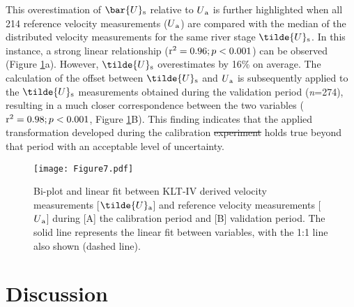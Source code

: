 \documentclass[hess, manuscript]{copernicus} %
\providecommand{\DIFadd}[1]{{\protect\color{blue}\uwave{#1}}} %
\providecommand{\DIFdel}[1]{{\protect\color{red}\sout{#1}}} %
\providecommand{\DIFaddbegin}{} %
\providecommand{\DIFaddend}{} %
\providecommand{\DIFdelbegin}{} %
\providecommand{\DIFdelend}{} %
\newcommand{\DIFscaledelfig}{0.5}
\newlength{\DIFdelgraphicswidth} %
\newlength{\DIFdelgraphicsheight} %
\newcommand{\DIFaddincludegraphics}[2][]{{\color{blue}\fbox{\DIFOincludegraphics[#1]{#2}}}} %
\newcommand{\DIFdelincludegraphics}[2][]{%
\sbox{\DIFdelgraphicsbox}{\DIFOincludegraphics[#1]{#2}}%
\settoboxwidth{\DIFdelgraphicswidth}{\DIFdelgraphicsbox} %
\settoboxtotalheight{\DIFdelgraphicsheight}{\DIFdelgraphicsbox} %
\scalebox{\DIFscaledelfig}{%
\parbox[b]{\DIFdelgraphicswidth}{\usebox{\DIFdelgraphicsbox}\\[-\baselineskip] \rule{\DIFdelgraphicswidth}{0em}}\llap{\resizebox{\DIFdelgraphicswidth}{\DIFdelgraphicsheight}{%
\setlength{\unitlength}{\DIFdelgraphicswidth}%
\begin{picture}(1,1)%
\thicklines\linethickness{2pt} %
{\color[rgb]{1,0,0}\put(0,0){\framebox(1,1){}}}%
{\color[rgb]{1,0,0}\put(0,0){\line( 1,1){1}}}%
{\color[rgb]{1,0,0}\put(0,1){\line(1,-1){1}}}%
\end{picture}%
}\hspace*{3pt}}} %
} %
\DeclareRobustCommand{\DIFaddbegin}{\DIFOaddbegin \let\includegraphics\DIFaddincludegraphics} %
\DeclareRobustCommand{\DIFaddend}{\DIFOaddend \let\includegraphics\DIFOincludegraphics} %
\DeclareRobustCommand{\DIFdelbegin}{\DIFOdelbegin \let\includegraphics\DIFdelincludegraphics} %
\DeclareRobustCommand{\DIFdelend}{\DIFOaddend \let\includegraphics\DIFOincludegraphics} %
\begin{document}
This overestimation of $\bar{U}\textsubscript{s}$ relative to $U\textsubscript{a}$ is further highlighted when all 214 reference velocity measurements ($U\textsubscript{a}$) are compared with the median of the distributed velocity measurements for the same river stage $\tilde{U}\textsubscript{s}$. In this instance, a strong linear relationship ($\textnormal{r\textsuperscript{2}} = 0.96; p < 0.001$) can be observed (Figure \ref{Figure7}a). However, $\tilde{U}\textsubscript{s}$ overestimates by 16\% on average. The calculation of the offset between $\tilde{U}\textsubscript{s}$ and $U\textsubscript{a}$ is subsequently applied to the $\tilde{U}\textsubscript{s}$ measurements obtained during the validation period (\textit{n}=274), resulting in a much closer correspondence between the two variables ($\textnormal{r\textsuperscript{2}} = 0.98; p < 0.001$, Figure \ref{Figure7}B). This finding indicates that the applied transformation developed during the calibration \DIFdelbegin \DIFdel{experiment }\DIFdelend \DIFaddbegin \DIFadd{period }\DIFaddend holds true beyond that period with an acceptable level of uncertainty.

\begin{figure}[!htb]
\centering 
\texttt{[image: Figure7.pdf]}
\caption{Bi-plot and linear fit between KLT-IV derived velocity measurements [$\tilde{U}\textsubscript{a}$] and reference velocity measurements [$U\textsubscript{a}$] during [A] the calibration period and [B] validation period. The solid line represents the linear fit between variables, with the 1:1 line also shown (dashed line).}
\label{Figure7} 
\end{figure}



\section{Discussion}
\end{document}
